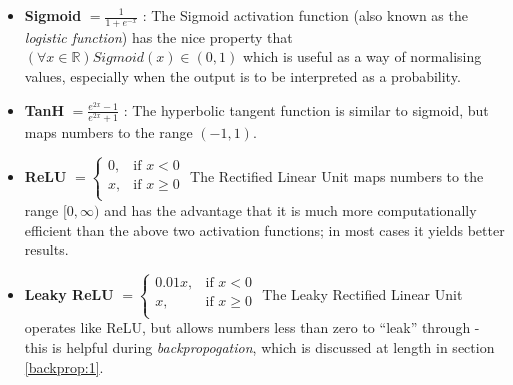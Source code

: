 \documentclass{report}
\begin{document}
	\begin{itemize}
		\item\textbf{Sigmoid} $= \frac{1}{1 + e^{-x}}$ : The Sigmoid activation function (also known as the \textit{logistic function}) has the nice property that $(\forall x \in \mathbb{R}) Sigmoid(x)\in(0, 1)$ which is useful as a way of normalising values, especially when the output is to be interpreted as a probability.
		
		\item\textbf{TanH} $= \frac{e^{2x} - 1}{e^{2x} + 1}$ : The hyperbolic tangent function is similar to sigmoid, but maps numbers to the range $(-1, 1)$.
		
		\item\textbf{ReLU} $= \begin{cases}
		0, & \text{if } x < 0 \\
		x, & \text{if } x \ge 0 \\
		\end{cases}$
		The Rectified Linear Unit maps numbers to the range $[0, \infty)$ and has the advantage that it is much more computationally efficient than the above two activation functions; in most cases it yields better results.
		\item\textbf{Leaky ReLU} $= \begin{cases}
		0.01x, & \text{if } x < 0 \\
		x, & \text{if } x \ge 0 \\
		\end{cases}$
		The Leaky Rectified Linear Unit operates like ReLU, but allows numbers less than zero to ``leak'' through - this is helpful during \textit{backpropogation}, which is discussed at length in section \ref{backprop:1}.
	\end{itemize}
\end{document}
